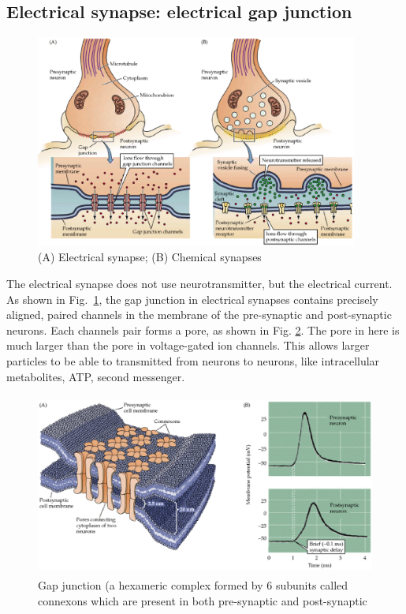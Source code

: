 \subsection{Electrical synapse: electrical gap junction}
\label{sec:gap-junction}
\label{sec:electrical_synapse}

\begin{figure}[htb]
  \centerline{\includegraphics[height=7cm]{./images/synapse_chemical_electrical.eps}}
\caption{(A) Electrical synapse; (B) Chemical synapses}\label{fig:synapse}
\end{figure} 

The electrical synapse does not use neurotransmitter, but the electrical
current. As shown in Fig.~\ref{fig:synapse}, the gap junction in electrical
synapses contains precisely aligned, paired channels in the membrane of the
pre-synaptic and post-synaptic neurons. Each channels pair forms a pore, as
shown in Fig. \ref{fig:gap_junction}. The pore in here is much larger than the
pore in voltage-gated ion channels. This allows larger particles to be able to
transmitted from neurons to neurons, like intracellular metabolites, ATP, second
messenger.

\begin{figure}[htb]
  \centerline{\includegraphics[height=6cm]{./images/gap_junction.eps}}
\caption{Gap junction (a hexameric complex formed by 6 subunits called
connexons which are present in both pre-synaptic and post-synaptic}\label{fig:gap_junction}
\end{figure} 

